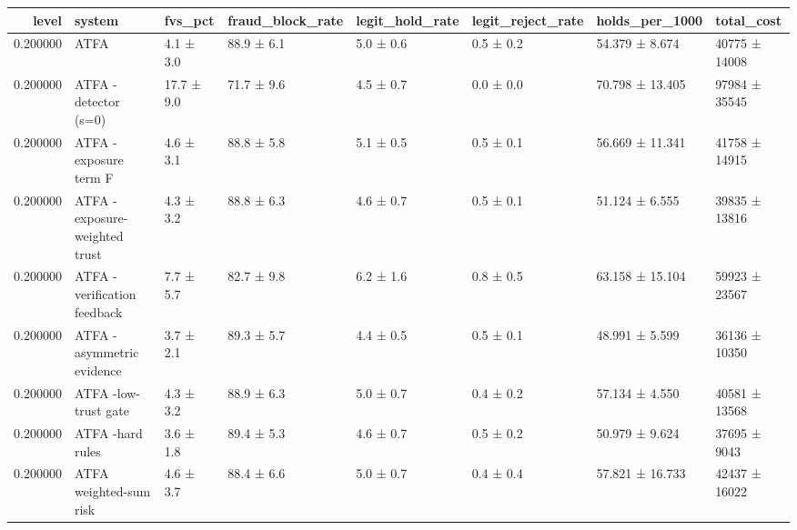 \begin{tabular}{rlllllll}
\toprule
level & system & fvs\_pct & fraud\_block\_rate & legit\_hold\_rate & legit\_reject\_rate & holds\_per\_1000 & total\_cost \\
\midrule
0.200000 & ATFA & 4.1 ± 3.0 & 88.9 ± 6.1 & 5.0 ± 0.6 & 0.5 ± 0.2 & 54.379 ± 8.674 & 40775 ± 14008 \\
0.200000 & ATFA -detector (s=0) & 17.7 ± 9.0 & 71.7 ± 9.6 & 4.5 ± 0.7 & 0.0 ± 0.0 & 70.798 ± 13.405 & 97984 ± 35545 \\
0.200000 & ATFA -exposure term F & 4.6 ± 3.1 & 88.8 ± 5.8 & 5.1 ± 0.5 & 0.5 ± 0.1 & 56.669 ± 11.341 & 41758 ± 14915 \\
0.200000 & ATFA -exposure-weighted trust & 4.3 ± 3.2 & 88.8 ± 6.3 & 4.6 ± 0.7 & 0.5 ± 0.1 & 51.124 ± 6.555 & 39835 ± 13816 \\
0.200000 & ATFA -verification feedback & 7.7 ± 5.7 & 82.7 ± 9.8 & 6.2 ± 1.6 & 0.8 ± 0.5 & 63.158 ± 15.104 & 59923 ± 23567 \\
0.200000 & ATFA -asymmetric evidence & 3.7 ± 2.1 & 89.3 ± 5.7 & 4.4 ± 0.5 & 0.5 ± 0.1 & 48.991 ± 5.599 & 36136 ± 10350 \\
0.200000 & ATFA -low-trust gate & 4.3 ± 3.2 & 88.9 ± 6.3 & 5.0 ± 0.7 & 0.4 ± 0.2 & 57.134 ± 4.550 & 40581 ± 13568 \\
0.200000 & ATFA -hard rules & 3.6 ± 1.8 & 89.4 ± 5.3 & 4.6 ± 0.7 & 0.5 ± 0.2 & 50.979 ± 9.624 & 37695 ± 9043 \\
0.200000 & ATFA weighted-sum risk & 4.6 ± 3.7 & 88.4 ± 6.6 & 5.0 ± 0.7 & 0.4 ± 0.4 & 57.821 ± 16.733 & 42437 ± 16022 \\
\bottomrule
\end{tabular}
